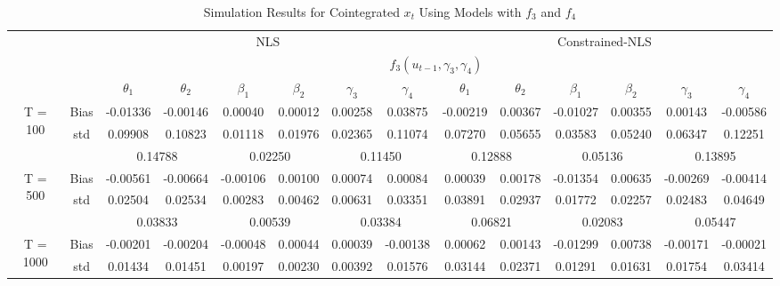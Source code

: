 \documentclass[a4paper,12pt,times,numbered,print,index]{report}
\numberwithin{equation}{section}
\begin{document}
\begin{table}[htbp]
  \centering
  \caption{Simulation Results for Cointegrated $x_t$ Using Models with $f_3$ and $f_4$}
    \begin{adjustbox}{max width=\textwidth}
    \begin{tabular}{cccccccccccccc}
    \toprule
    &       & \multicolumn{6}{c}{NLS}                       & \multicolumn{6}{c}{Constrained-NLS} \\
		&       & \multicolumn{12}{c}{$f_3 (u_{t-1}, \gamma_3, \gamma_4)$} \\
		&       & $\theta_1$ & $\theta_2$ & $\beta_1$ & $\beta_2$ & $\gamma_3$ & $\gamma_{4}$ & $\theta_1$ & $\theta_2$ & $\beta_1$ & $\beta_2$ & $\gamma_3$ & $\gamma_{4}$ \\
		\midrule
    \multirow{3}[1]{*}{T = 100} & Bias  & \textcolor[rgb]{ 0,  .439,  .753}{-0.01336} & -0.00146 & 0.00040 & 0.00012 & 0.00258 & 0.03875 & \textcolor[rgb]{ 0,  .439,  .753}{-0.00219} & 0.00367 & -0.01027 & 0.00355 & 0.00143 & -0.00586 \\
          & std   & 0.09908 & 0.10823 & 0.01118 & 0.01976 & 0.02365 & 0.11074 & 0.07270 & 0.05655 & 0.03583 & 0.05240 & 0.06347 & 0.12251 \\
          &       & \multicolumn{2}{c}{0.14788} & \multicolumn{2}{c}{0.02250} & \multicolumn{2}{c}{0.11450} & \multicolumn{2}{c}{0.12888} & \multicolumn{2}{c}{0.05136} & \multicolumn{2}{c}{0.13895} \\
    \multirow{3}[0]{*}{T = 500} & Bias  & \textcolor[rgb]{ 0,  .439,  .753}{-0.00561} & -0.00664 & -0.00106 & 0.00100 & 0.00074 & 0.00084 & \textcolor[rgb]{ 0,  .439,  .753}{0.00039} & 0.00178 & -0.01354 & 0.00635 & -0.00269 & -0.00414 \\
          & std   & 0.02504 & 0.02534 & 0.00283 & 0.00462 & 0.00631 & 0.03351 & 0.03891 & 0.02937 & 0.01772 & 0.02257 & 0.02483 & 0.04649 \\
          &       & \multicolumn{2}{c}{0.03833} & \multicolumn{2}{c}{0.00539} & \multicolumn{2}{c}{0.03384} & \multicolumn{2}{c}{0.06821} & \multicolumn{2}{c}{0.02083} & \multicolumn{2}{c}{0.05447} \\
    \multirow{3}[1]{*}{T = 1000} & Bias  & \textcolor[rgb]{ 0,  .439,  .753}{-0.00201} & -0.00204 & -0.00048 & 0.00044 & 0.00039 & -0.00138 & \textcolor[rgb]{ 0,  .439,  .753}{0.00062} & 0.00143 & -0.01299 & 0.00738 & -0.00171 & -0.00021 \\
          & std   & 0.01434 & 0.01451 & 0.00197 & 0.00230 & 0.00392 & 0.01576 & 0.03144 & 0.02371 & 0.01291 & 0.01631 & 0.01754 & 0.03414 \\

\end{tabular}
\end{adjustbox}
\end{table}
\end{document}
